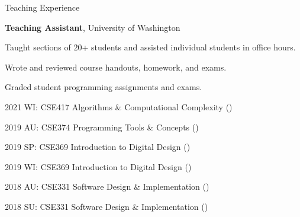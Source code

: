 \begin{rubric}{Teaching Experience}

%
	\textbf{Teaching Assistant}, University of Washington
	\par Taught sections of 20+ students and assisted individual students in office hours.
	\par Wrote and reviewed course handouts, homework, and exams.
	\par Graded student programming assignments and exams.
	\par 2021 WI: CSE417 Algorithms \& Computational Complexity (\pWeberR{})
	\par 2019 AU: CSE374 Programming Tools \& Concepts (\pPirtleT{})
	\par 2019 SP: CSE369 Introduction to Digital Design (\pHsiaJ{})
	\par 2019 WI: CSE369 Introduction to Digital Design (\pHsiaJ{})
	\par 2018 AU: CSE331 Software Design \& Implementation (\pErnstM{})
	\par 2018 SU: CSE331 Software Design \& Implementation (\pPerlmutterL{})
\end{rubric}